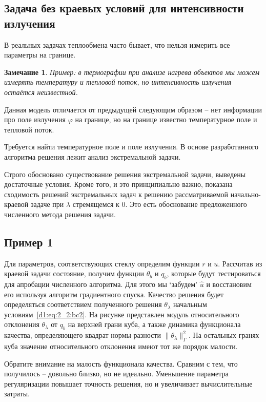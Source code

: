 \documentclass[8pt,a4paper]{article}
\newtheorem*{remark}{Замечание}
\begin{document}
    \subsection*{Задача без краевых условий для интенсивности излучения}
    В реальных задачах теплообмена часто бывает, что нельзя измерить все параметры на границе.


    \begin{remark}
    Пример: в термографии при анализе нагрева объектов мы можем измерять температуру и тепловой поток, но интенсивность излучения остаётся неизвестной.
    \end{remark}
    Данная модель отличается от предыдущей следующим образом -- нет информации про поле излучения $\varphi$ на границе,
    но на границе известно температурное поле и тепловой поток.

    Требуется найти температурное поле и поле излучения.
    В основе разработанного алгоритма решения лежит анализ экстремальной задачи.

    Строго обосновано существование решения экстремальной задачи, выведены достаточные условия.
    Кроме того, и это принципиально важно, показана сходимость решений экстремальных задач
    к решению рассматриваемой начально-краевой задаче при $\lambda$ стремящемся к 0.
    Это есть обоснование предложенного численного метода решения задачи.

    \subsection*{Пример 1}
    Для параметров, соответствующих стеклу определим функции $r$ и $u$.
    Рассчитав из краевой задачи состояние, получим функции $\theta_b$ и $q_b$, которые будут
    тестироваться для апробации численного алгоритма.
    Для этого мы `забудем' $\hat u$ и восстановим его используя алгоритм градиентного спуска.
    Качество решения будет определяться соответствием полученного решения $\theta_\lambda$ начальным
    условиям~\eqref{d1:eq:2_2:bc2}.
    На рисунке представлен модуль относительного отклонения $\theta_\lambda$
    от $q_b$ на верхней грани куба, а также динамика
    функционала качества, определяющего квадрат нормы разности $\|\theta_\lambda\|^2_\Gamma$.
    На остальных гранях куба значение относительного отклонения имеют тот же порядок малости.

    Обратите внимание на малость функционала качества.
    Сравним с тем, что получилось -- довольно близко, но не идеально.
    Уменьшение параметра регуляризации повышает точность решения,
    но и увеличивает вычислительные затраты.
\end{document}
